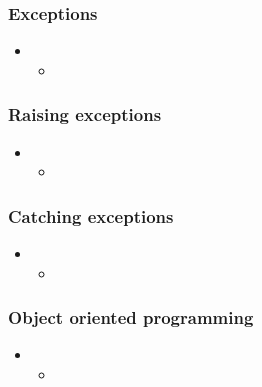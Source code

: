 \begin{frame}[fragile]
%
  \frametitle{Exceptions}
%
  \begin{itemize}
%
  \item 
    \begin{itemize}
    \item
    \end{itemize}
%
  \end{itemize}
%
\end{frame}

\begin{frame}[fragile]
%
  \frametitle{Raising exceptions}
%
  \begin{itemize}
%
  \item 
    \begin{itemize}
    \item
    \end{itemize}
%
  \end{itemize}
%
\end{frame}

\begin{frame}[fragile]
%
  \frametitle{Catching exceptions}
%
  \begin{itemize}
%
  \item 
    \begin{itemize}
    \item
    \end{itemize}
%
  \end{itemize}
%
\end{frame}

\begin{frame}[fragile]
%
  \frametitle{Object oriented programming}
%
  \begin{itemize}
%
  \item 
    \begin{itemize}
    \item
    \end{itemize}
%
  \end{itemize}
%
\end{frame}

